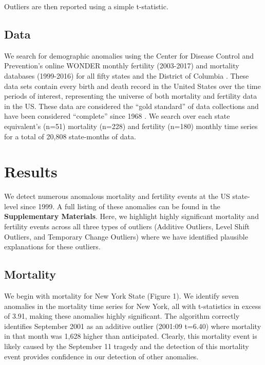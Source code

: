 \documentclass[12pt]{article}
\begin{document}
Outliers are then reported using a simple t-statistic.

\hypertarget{data}{%
\subsection{Data}\label{data}}

We search for demographic anomalies using the Center for Disease Control
and Prevention's online WONDER monthly fertility (2003-2017) and
mortality databases (1999-2016) for all fifty states and the District of
Columbia \citep{CDC_fert07, CDC_mort}. These data sets contain every
birth and death record in the United States over the time periods of
interest, representing the universe of both mortality and fertility data
in the US. These data are considered the ``gold standard'' of data
collections \citep{mahapatra2007civil} and have been considered
``complete'' since 1968 \citep{hetzel2016us}. We search over each state
equivalent's (n=51) mortality (n=228) and fertility (n=180) monthly time
series for a total of 20,808 state-months of data.

\hypertarget{results}{%
\section{Results}\label{results}}

We detect numerous anomalous mortality and fertility events at the US
state-level since 1999. A full listing of these anomalies can be found
in the \textbf{Supplementary Materials}. Here, we highlight highly
significant mortality and fertility events across all three types of
outliers (Additive Outliers, Level Shift Outliers, and Temporary Change
Outliers) where we have identified plausible explanations for these
outliers.

\hypertarget{mortality}{%
\subsection{Mortality}\label{mortality}}

We begin with mortality for New York State (Figure 1). We identify seven
anomalies in the mortality time series for New York, all with
t-statistics in excess of 3.91, making these anomalies highly
significant. The algorithm correctly identifies September 2001 as an
additive outlier (2001:09 t=6.40) where mortality in that month was
1,628 higher than anticipated. Clearly, this mortality event is likely
caused by the September 11 tragedy and the detection of this mortality
event provides confidence in our detection of other anomalies.

\newpage



\end{document}
